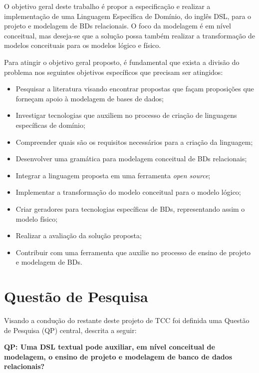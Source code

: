 O objetivo geral deste trabalho é propor a especificação e realizar a implementação de uma Linguagem Específica de Domínio, do inglês \ac{DSL}, para o projeto e modelagem de \acp{BD} relacionais. 
O foco da modelagem é em nível conceitual, mas deseja-se que a solução possa também realizar a transformação de modelos conceituais para os modelos lógico e físico. 

Para atingir o objetivo geral proposto, é fundamental que exista a divisão do problema nos seguintes objetivos específicos que precisam ser atingidos:

\begin{itemize} 
    \item Pesquisar a literatura visando encontrar propostas que façam proposições que forneçam apoio à modelagem de bases de dados; 
    \item Investigar tecnologias que auxiliem no processo de criação de linguagens específicas de domínio;
    \item Compreender quais são os requisitos necessários para a criação da linguagem;
    \item Desenvolver uma gramática para modelagem conceitual de \acp{BD} relacionais;
    \item Integrar a linguagem proposta em uma ferramenta \textit{open source};
    \item Implementar a transformação do modelo conceitual para o modelo lógico;
    \item Criar geradores para tecnologias específicas de \acp{BD}, representando assim o modelo físico;
    \item Realizar a avaliação da solução proposta;
    \item Contribuir com uma ferramenta que auxilie no processo de ensino de projeto e modelagem de \acp{BD}.
\end{itemize}

\section{Questão de Pesquisa}

Visando a condução do restante deste projeto de \ac{TCC} foi definida uma Questão de Pesquisa (QP) central, descrita a seguir:

\textbf{QP: Uma \ac{DSL} textual pode auxiliar, em nível conceitual de modelagem, o ensino de projeto e modelagem de banco de dados relacionais?}

